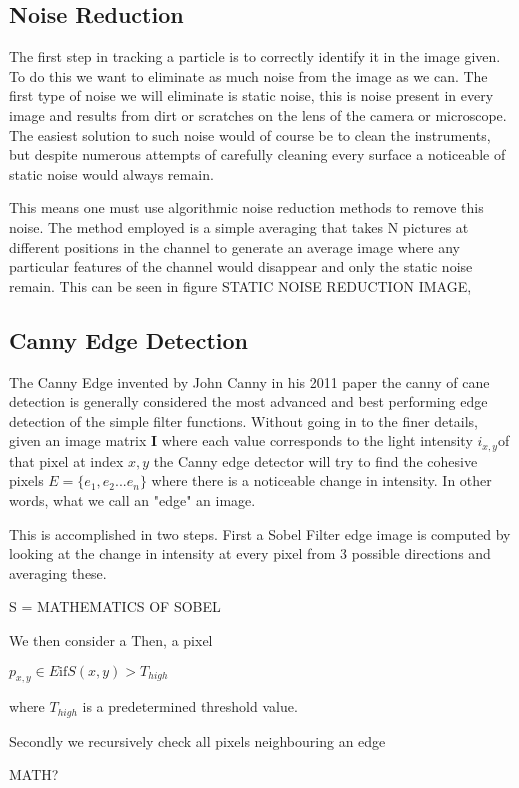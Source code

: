 \subsection{Noise Reduction}
The first step in tracking a particle is to correctly identify it in the image given. To do this we want to eliminate as much noise from the image as we can. The first type of noise we will eliminate is static noise, this is noise present in every image and results from dirt or scratches on the lens of the camera or microscope. 
The easiest solution to such noise would of course be to clean the instruments, but despite numerous attempts of carefully cleaning every surface a noticeable of static noise would always remain. 

This means one must use algorithmic noise reduction methods to remove this noise. The method employed is a simple averaging that takes N pictures at different positions in the channel to generate an average image where any particular features of the channel would disappear and only the static noise remain. This can be seen in figure STATIC NOISE REDUCTION IMAGE,


\subsection{Canny Edge Detection}
The Canny Edge invented by John Canny in his 2011 paper the canny of cane detection is generally considered the most advanced and best performing edge detection of the simple filter functions. 
Without going in to the finer details, given an image matrix $\mathbf{I}$ where each value corresponds to the light intensity $i_{x,y}$of that pixel at index $x,y$ the Canny edge detector will try to find the cohesive pixels $E = \{e_1, e_2... e_n\}$ where there is a noticeable change in intensity. In other words, what we call an "edge" an image. 

This is accomplished in two steps. First a Sobel Filter edge image is computed by looking at the change in intensity at every pixel from 3 possible directions and averaging these. 

S = MATHEMATICS OF SOBEL

We then consider a Then, a pixel 

$p_{x,y} \in E \text{if} S(x,y) > T_{high}$

where $T_{high}$ is a predetermined threshold value. 

Secondly we recursively check all pixels neighbouring an edge

MATH?

